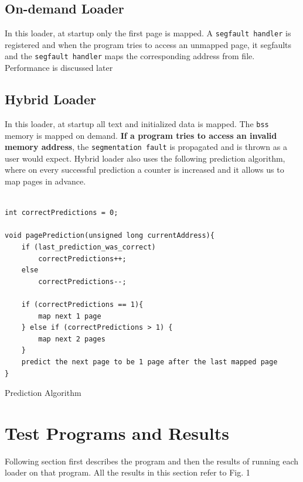 \documentclass[10pt] {article}
\begin{document}
\subsection{On-demand Loader}
In this loader, at startup only the first page is mapped. A \texttt{segfault handler} is registered and when the program tries to access an unmapped page, it segfaults and the \texttt{segfault handler} maps the corresponding address from file. Performance is discussed later\\

\subsection{Hybrid Loader}
In this loader, at startup all text and initialized data is mapped. The \texttt{bss} memory is mapped on demand. 
\textbf{If a program tries to access an invalid memory address}, the \texttt{segmentation fault} is propagated and is thrown as a user would expect.
Hybrid loader also uses the following prediction algorithm, where on every successful prediction a counter is increased and it allows us to map pages in advance.


\begin{listing}[ht!]
\begin{verbatim}

int correctPredictions = 0;

void pagePrediction(unsigned long currentAddress){
	if (last_prediction_was_correct)
		correctPredictions++;
	else 
		correctPredictions--;
		
	if (correctPredictions == 1){
		map next 1 page
	} else if (correctPredictions > 1) {
		map next 2 pages
	}
	predict the next page to be 1 page after the last mapped page
}

\end{verbatim}
\label{lst:sched}
\caption{Prediction Algorithm}
\end{listing}

\section{Test Programs and Results}
Following section first describes the program and then the results of running each loader on that program. All the results in this section refer to Fig. 1 %
\end{document}
